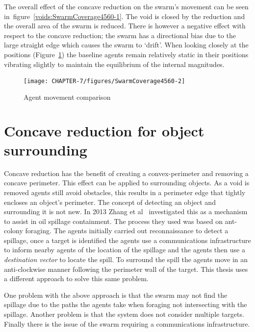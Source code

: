 The overall effect of the concave reduction on the swarm's movement can be seen in~figure~\ref{voids:SwarmCoverage4560-1}. The void is closed by the reduction and the overall area of the swarm is reduced. There is however a negative effect with respect to the concave reduction; the swarm has a directional bias due to the large straight edge which causes the swarm to `drift'. When looking closely at the positions (Figure~\ref{voids:SwarmCoverage4560-2}) the baseline agents remain relatively static in their positions vibrating slightly to maintain the equilibrium of the internal magnitudes. 
\begin{figure}[H]
\begin{center}
\texttt{[image: CHAPTER-7/figures/SwarmCoverage4560-2]}
\end{center}
\caption{Agent movement comparison\label{voids:SwarmCoverage4560-2}}
\end{figure}

\section{Concave reduction for object surrounding}\label{voids:ObjectSurrounding}
Concave reduction has the benefit of creating a convex-perimeter and removing a concave perimeter. This effect can be applied to surrounding objects. As a void is removed agents still avoid obstacles, this results in a perimeter edge that tightly encloses an object's perimeter. The concept of detecting an object and surrounding it is not new. In 2013 Zhang et al~\cite{ZFG:13} investigated this as a mechanism to assist in oil spillage containment. The process they used was based on ant-colony foraging. The agents initially carried out reconnaissance to detect a spillage, once a target is identified the agents use a communications infrastructure to inform nearby agents of the location of the spillage and the agents then use a \textit{destination vector} to locate the spill. To surround the spill the agents move in an anti-clockwise manner following the perimeter wall of the target. This thesis uses a different approach to solve this same problem.

One problem with the above approach is that the swarm may not find the spillage due to the paths the agents take when foraging not intersecting with the spillage. Another problem is that the system does not consider multiple targets. Finally there is the issue of the swarm requiring a communications infrastructure. 

